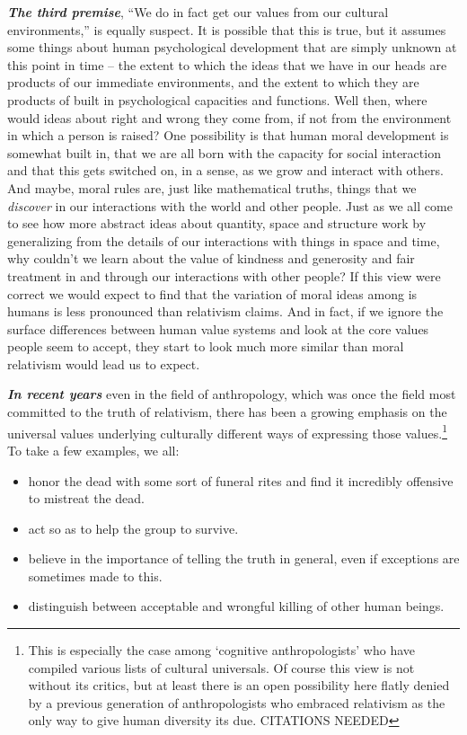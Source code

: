 \documentclass[12pt, openany]{book}
\providecommand{\tightlist}{%
  \setlength{\itemsep}{0pt}\setlength{\parskip}{0pt}}
\begin{document}
\textbf{\emph{The third premise}}, ``We do in fact get our values from our cultural environments,'' is equally suspect. It is possible that this is true, but it assumes some things about human psychological development that are simply unknown at this point in time -- the extent to which the ideas that we have in our heads are products of our immediate environments, and the extent to which they are products of built in psychological capacities and functions. Well then, where would ideas about right and wrong they come from, if not from the environment in which a person is raised? One possibility is that human moral development is somewhat built in, that we are all born with the capacity for social interaction and that this gets switched on, in a sense, as we grow and interact with others. And maybe, moral rules are, just like mathematical truths, things that we \emph{discover} in our interactions with the world and other people. Just as we all come to see how more abstract ideas about quantity, space and structure work by generalizing from the details of our interactions with things in space and time, why couldn't we learn about the value of kindness and generosity and fair treatment in and through our interactions with other people? If this view were correct we would expect to find that the variation of moral ideas among is humans is less pronounced than relativism claims. And in fact, if we ignore the surface differences between human value systems and look at the core values people seem to accept, they start to look much more similar than moral relativism would lead us to expect.

\textbf{\emph{In recent years}} even in the field of anthropology, which was once the field most committed to the truth of relativism, there has been a growing emphasis on the universal values underlying culturally different ways of expressing those values.\footnote{This is especially the case among `cognitive anthropologists' who have compiled various lists of cultural universals. Of course this view is not without its critics, but at least there is an open possibility here flatly denied by a previous generation of anthropologists who embraced relativism as the only way to give human diversity its due. CITATIONS NEEDED} To take a few examples, we all:

\begin{itemize}
\tightlist
\item
  honor the dead with some sort of funeral rites and find it incredibly offensive to mistreat the dead.
\item
  act so as to help the group to survive.
\item
  believe in the importance of telling the truth in general, even if exceptions are sometimes made to this.
\item
  distinguish between acceptable and wrongful killing of other human beings.
\end{itemize}
\end{document}
